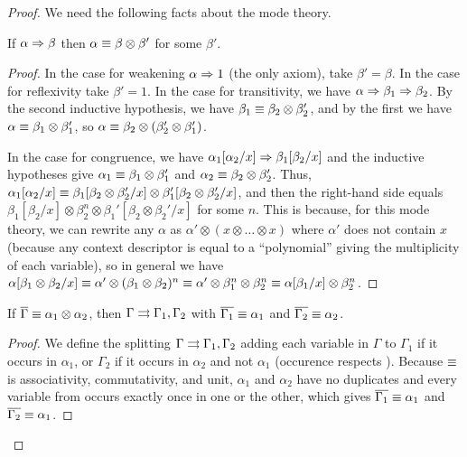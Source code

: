 \begin{proof}
We need the following facts about the mode theory.  

\begin{lemma} \label{lem:affine-mode-1}
If $\alpha \Rightarrow \beta$ then $\alpha \equiv \beta \otimes \beta'$
for some $\beta'$.
\end{lemma}
\begin{proof}

In the case for weakening $\alpha \Rightarrow 1$ (the only axiom), take
$\beta' = \beta$.  In the case for reflexivity take $\beta' =
1$.  In the case for transitivity, we have $\alpha \Rightarrow \beta_1
\Rightarrow \beta_2$.  By the second inductive hypothesis, we have
$\beta_1 \equiv \beta_2 \otimes \beta_2'$, and by the first we have
$\alpha \equiv \beta_1 \otimes \beta_1'$, so 
$\alpha \equiv \beta_2 \otimes (\beta_2' \otimes \beta_1')$.  

In the case for congruence, we have
$\alpha_1[\alpha_2/x] \Rightarrow \beta_1[\beta_2/x]$
and the inductive hypotheses give
    $\alpha_1 \equiv \beta_1 \otimes \beta_1'$
and $\alpha_2 \equiv \beta_2 \otimes \beta_2'$.  
Thus, 
$\alpha_1[\alpha_2/x] \equiv \beta_1[\beta_2 \otimes \beta_2'/x] \otimes \beta_1'[\beta_2 \otimes \beta_2'/x]$,
and then the right-hand side equals 
$\beta_1[\beta_2/x] \otimes \beta_2^n \otimes \beta_1'[\beta_2 \otimes \beta_2'/x]$
for some $n$.  
This is because, 
for this mode theory, we can rewrite any $\alpha$ as $\alpha' \otimes (x
\otimes \ldots \otimes x)$ where $\alpha'$ does not contain $x$ (because
any context descriptor is equal to a ``polynomial'' giving the
multiplicity of each variable), so in general we have $\alpha[\beta_1
  \otimes \beta_2/x] \equiv \alpha' \otimes (\beta_1 \otimes \beta_2)^n
\equiv \alpha' \otimes \beta_1^n \otimes \beta_2^n \equiv \alpha[\beta_1/x]
\otimes \beta_2^n$.
\end{proof}

\begin{lemma} \label{lem:affine-mode-5}
If $\overline{\Gamma} \equiv \alpha_1 \otimes \alpha_2$, 
then $\Gamma \rightrightarrows \Gamma_1,\Gamma_2$ with 
$\overline{\Gamma_1} \equiv \alpha_1$ 
and $\overline{\Gamma_2} \equiv \alpha_2$.  
\end{lemma}
\begin{proof}
We define the splitting $\Gamma \rightrightarrows \Gamma_1,\Gamma_2$ adding each
variable in $\Gamma$ to $\Gamma_1$ if it occurs in $\alpha_1$, or
$\Gamma_2$ if it occurs in $\alpha_2$ and not $\alpha_1$ (occurence
respects \deq).  Because $\equiv$ is associativity, commutativity, and
unit, $\alpha_1$ and $\alpha_2$ have no duplicates and every variable
from \vars{\Gamma} occurs exactly once in one or the other, which gives
$\overline{\Gamma_1} \equiv \alpha_1$ and $\overline{\Gamma_2} \equiv \alpha_1$.
\end{proof}


\end{proof}

